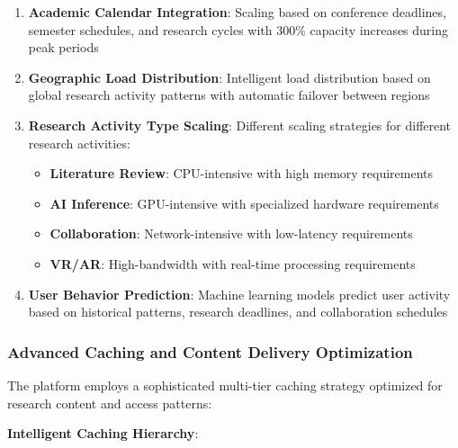 \documentclass[10pt,twocolumn]{article}
\begin{document}
\begin{enumerate}
    \item \textbf{Academic Calendar Integration}: Scaling based on conference deadlines, semester schedules, and research cycles with 300\% capacity increases during peak periods
    
    \item \textbf{Geographic Load Distribution}: Intelligent load distribution based on global research activity patterns with automatic failover between regions
    
    \item \textbf{Research Activity Type Scaling}: Different scaling strategies for different research activities:
    \begin{itemize}
        \item \textbf{Literature Review}: CPU-intensive with high memory requirements
        \item \textbf{AI Inference}: GPU-intensive with specialized hardware requirements
        \item \textbf{Collaboration}: Network-intensive with low-latency requirements
        \item \textbf{VR/AR}: High-bandwidth with real-time processing requirements
    \end{itemize}
    
    \item \textbf{User Behavior Prediction}: Machine learning models predict user activity based on historical patterns, research deadlines, and collaboration schedules
\end{enumerate}

\subsubsection{Advanced Caching and Content Delivery Optimization}

The platform employs a sophisticated multi-tier caching strategy optimized for research content and access patterns:

\textbf{Intelligent Caching Hierarchy}:
\end{document}
